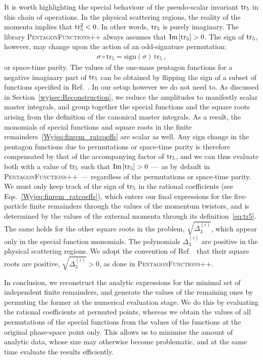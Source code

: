 \documentclass[main.tex]{subfiles}
\begin{document}
It is worth highlighting the special behaviour of the pseudo-scalar invariant $\operatorname{\rm tr}_5$ in this chain of operations. In the physical scattering regions, the reality of the momenta implies that $\operatorname{\rm tr}_5^2 < 0$. In other words, $\operatorname{\rm tr}_5$ is purely imaginary. The library \textsc{PentagonFunctions++} always assumes that $\text{Im}\left[\operatorname{\rm tr}_5\right]>0$. The sign of $\operatorname{\rm tr}_5$, however, may change upon the action of an odd-signature permutation:
\begin{align}
\sigma \circ \text{tr}_5 = \text{sign}(\sigma) \, \text{tr}_5 \,,
\end{align}
or space-time parity.
The values of the one-mass pentagon functions for a negative imaginary part of $\operatorname{\rm tr}_5$ can be obtained by flipping the sign of a subset of functions specified in Ref.~\cite{Chicherin:2021dyp}. In our setup however we do not need to. As discussed in Section~\ref{wyjsec:Reconstruction}, we reduce the amplitudes to manifestly scalar master integrals, and group together the special functions and the square roots arising from the definition of the canonical master integrals. As a result, the monomials of special functions and square roots in the finite remainders~\eqref{Wyjeq:finrem_ratcoeffs} are scalar as well. Any sign change in the pentagon functions due to permutations or space-time parity is therefore compensated by that of the accompanying factor of $\operatorname{\rm tr}_5$, and we can thus evaluate both with a value of $\operatorname{\rm tr}_5$ such that $\text{Im}\left[\operatorname{\rm tr}_5\right]>0$ ---~as by default in \textsc{PentagonFunctions++}~--- regardless of the permutations or space-time parity. We must only keep track of the sign of $\operatorname{\rm tr}_5$ in the rational coefficients (see Eqs.~\eqref{Wyjeq:finrem_ratcoeffs}), which enters our final expressions for the five-particle finite remainders through the values of the momentum twistors, and is determined by the values of the external momenta through its definition~\eqref{eq:tr5}.
The same holds for the other square roots in the problem, $\sqrt{\Delta_3^{(i)}}$, which appear only in the special function monomials. The polynomials $\Delta_3^{(i)}$ are positive in the physical scattering regions. We adopt the convention of Ref.~\cite{Chicherin:2021dyp} that their square roots are positive, $\sqrt{\Delta_3^{(i)}}>0$, as done in \textsc{PentagonFunctions++}.

In conclusion, we reconstruct the analytic expressions for the minimal set of independent finite remainders, and generate the values of the remaining ones by permuting the former at the numerical evaluation stage. We do this by evaluating the rational coefficients at permuted points, whereas we obtain the values of all permutations of the special functions from the values of the functions at the original phase-space point only. This allows us to minimise the amount of analytic data, whose size may otherwise become problematic, and at the same time evaluate the results efficiently.
\end{document}
